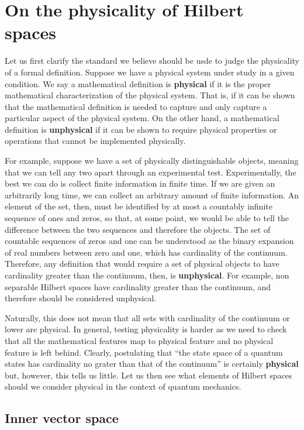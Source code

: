 \documentclass[10pt,twocolumn, nofootinbib]{revtex4-2}
\begin{document}
\section{On the physicality of Hilbert spaces}

Let us first clarify the standard we believe should be usde to judge the physicality of a formal definition. Suppose we have a physical system under study in a given condition. We say a mathematical definition is \textbf{physical} if it is the proper mathematical characterization of the physical system. That is, if it can be shown that the mathematical definition is needed to capture and only capture a particular aspect of the physical system. On the other hand, a mathematical definition is \textbf{unphysical} if it can be shown to require physical properties or operations that cannot be implemented physically.

For example, suppose we have a set of physically distinguishable objects, meaning that we can tell any two apart through an experimental test. Experimentally, the best we can do is collect finite information in finite time. If we are given an arbitrarily long time, we can collect an arbitrary amount of finite information. An element of the set, then, must be identified by at most a countably infinite sequence of ones and zeros, so that, at some point, we would be able to tell the difference between the two sequences and therefore the objects. The set of countable sequences of zeros and one can be understood as the binary expansion of real numbers between zero and one, which has cardinality of the continuum. Therefore, any definition that would require a set of physical objects to have cardinality greater than the continuum, then, is \textbf{unphysical}. For example, non separable Hilbert spaces have cardinality greater than the continuum, and therefore should be considered unphysical.

Naturally, this does not mean that all sets with cardinality of the continuum or lower are physical. In general, testing physicality is harder as we need to check that all the mathematical features map to physical feature and no physical feature is left behind. Clearly, postulating that ``the state space of a quantum states has cardinality no grater than that of the continuum'' is certainly \textbf{physical} but, however, this tells us little. Let us then see what elements of Hilbert spaces should we consider physical in the context of quantum mechanics.

\subsection{Inner vector space}
\end{document}
